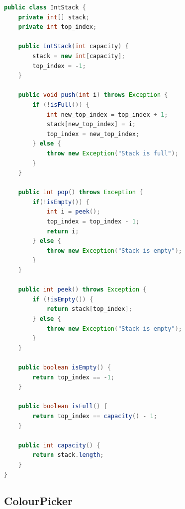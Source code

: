 \begin{lstlisting}[language=Java, caption=IntStack]
public class IntStack {
    private int[] stack;
    private int top_index;

    public IntStack(int capacity) {
        stack = new int[capacity];
        top_index = -1;
    }

    public void push(int i) throws Exception {
        if (!isFull()) {
            int new_top_index = top_index + 1;
            stack[new_top_index] = i;
            top_index = new_top_index;
        } else {
            throw new Exception("Stack is full");
        }
    }

    public int pop() throws Exception {
        if(!isEmpty()) {
            int i = peek();
            top_index = top_index - 1;
            return i;
        } else {
            throw new Exception("Stack is empty");
        }
    }

    public int peek() throws Exception {
        if (!isEmpty()) {
            return stack[top_index];
        } else {
            throw new Exception("Stack is empty");
        }
    }

    public boolean isEmpty() {
        return top_index == -1;
    }

    public boolean isFull() {
        return top_index == capacity() - 1;
    }

    public int capacity() {
        return stack.length;
    }
}
\end{lstlisting}

\subsection{ColourPicker}

